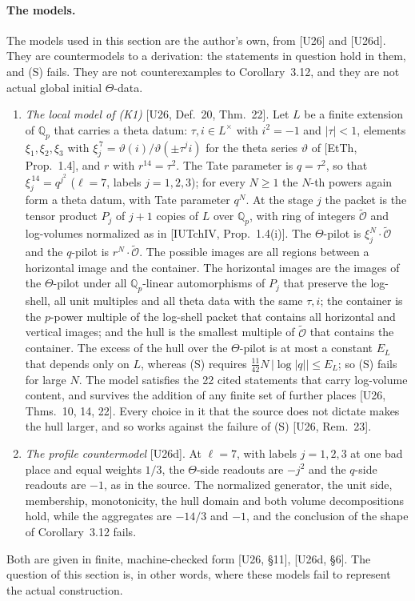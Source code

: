 \documentclass[11pt]{article}
\theoremstyle{definition}
\begin{document}
\paragraph{The models.}  The models used in this section are the
author's own, from [U26] and [U26d].  They are countermodels to a
derivation: the statements in question hold in them, and (S) fails.
They are not counterexamples to Corollary~3.12, and they are not
actual global initial $\Theta$-data.
\begin{enumerate}[label=(M\arabic*),leftmargin=*]
\item \emph{The local model of (K1)} [U26, Def.~20, Thm.~22].  Let
$L$ be a finite extension of $\mathbb Q_p$ that carries a theta
datum: $\tau,i\in L^\times$ with $i^2=-1$ and $|\tau|<1$, elements
$\xi_1,\xi_2,\xi_3$ with
$\xi_j^{\,7}=\vartheta(i)/\vartheta(\pm\tau^j i)$ for the theta
series $\vartheta$ of [EtTh, Prop.~1.4], and $r$ with
$r^{14}=\tau^2$.  The Tate parameter is $q=\tau^2$, so that
$\xi_j^{\,14}=q^{j^2}$ ($\ell=7$, labels $j=1,2,3$); for every
$N\ge1$ the $N$-th powers again form a theta datum, with Tate
parameter $q^N$.  At the stage $j$ the packet is the tensor product
$P_j$ of $j+1$ copies of $L$ over $\mathbb Q_p$, with ring of
integers $\widetilde{\mathcal O}$ and log-volumes normalized as in
[IUTchIV, Prop.~1.4(i)].  The $\Theta$-pilot is
$\xi_j^N\cdot\widetilde{\mathcal O}$ and the $q$-pilot is
$r^N\cdot\widetilde{\mathcal O}$.  The possible images are all
regions between a horizontal image and the container.  The
horizontal images are the images of the $\Theta$-pilot under all
$\mathbb Q_p$-linear automorphisms of $P_j$ that preserve the
log-shell, all unit multiples and all theta data with the same
$\tau,i$; the container is the $p$-power multiple of the log-shell
packet that contains all horizontal and vertical images; and the
hull is the smallest multiple of $\widetilde{\mathcal O}$ that
contains the container.  The excess of the hull over the
$\Theta$-pilot is at most a constant $E_L$ that depends only on $L$,
whereas (S) requires $\frac{11}{42}N\,|\log|q||\le E_L$; so (S)
fails for large $N$.  The model satisfies the 22 cited statements
that carry log-volume content, and survives the addition of any
finite set of further places [U26, Thms.~10, 14, 22].  Every choice
in it that the source does not dictate makes the hull larger, and so
works against the failure of (S) [U26, Rem.~23].
\item \emph{The profile countermodel} [U26d].  At $\ell=7$, with
labels $j=1,2,3$ at one bad place and equal weights $1/3$, the
$\Theta$-side readouts are $-j^2$ and the $q$-side readouts are
$-1$, as in the source.  The normalized generator, the unit side,
membership, monotonicity, the hull domain and both volume
decompositions hold, while the aggregates are $-14/3$ and $-1$, and
the conclusion of the shape of Corollary~3.12 fails.
\end{enumerate}
Both are given in finite, machine-checked form [U26, \S11],
[U26d, \S6].  The question of this section is, in other words, where
these models fail to represent the actual construction.
\end{document}
